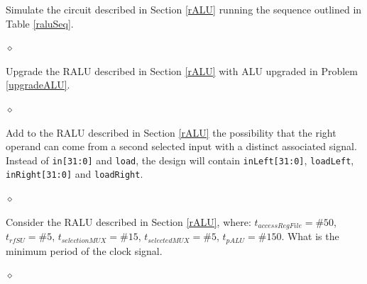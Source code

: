 \begin{problem}
Simulate the circuit described in Section \ref{rALU} running the sequence outlined in Table \ref{raluSeq}.

$\diamond$
\end{problem}

\begin{problem}
Upgrade the RALU described in Section \ref{rALU} with ALU upgraded in Problem \ref{upgradeALU}.

$\diamond$
\end{problem}


\begin{problem}
Add to the RALU described in Section \ref{rALU} the possibility that the right operand can come from a second selected input with a distinct associated signal. Instead of {\tt in[31:0]} and {\tt load}, the design will contain {\tt inLeft[31:0]}, {\tt loadLeft}, {\tt inRight[31:0]} and {\tt loadRight}.

$\diamond$
\end{problem}


\begin{problem}
Consider the RALU described in Section \ref{rALU}, where: $t_{accessRegFile} = \#50$, $t_{rfSU} = \#5$, $t_{selectionMUX} = \#15$, $t_{selectedMUX} = \#5$, $t_{pALU} = \#150$. What is the minimum period of the clock signal.

$\diamond$
\end{problem}



